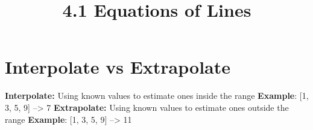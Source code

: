 \documentclass{article}
\begin{document}
	
	\setlength{\droptitle}{-5em}
	\title{4.1 Equations of Lines}
	\date{}
	\author{}
	\maketitle
	
	\section{Interpolate vs Extrapolate}
	
	\textbf{Interpolate: }Using known values to estimate ones inside the range \newline
	\textbf{Example}: [1, 3, 5, 9] --> 7
	\newline \newline
	\textbf{Extrapolate: }Using known values to estimate ones outside the range \newline
	\textbf{Example}: [1, 3, 5, 9] --> 11
	
	
\end{document}
